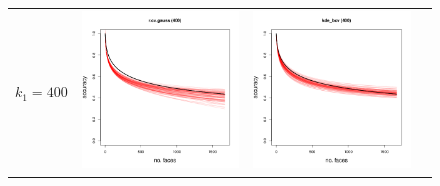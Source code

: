 \documentclass[twoside,11pt]{article}
\newenvironment{myfont}{\fontfamily{phv}\selectfont}{\par}
\begin{document}
\begin{figure}[t]
\begin{tabular}{cccc}
\begin{myfont}$k_1 = 400$\end{myfont} &
\includegraphics[scale = 0.2, clip = true, trim = 0 0 0 0.6in, valign=c]{repeat_400_r_cv_gauss.png} &
\includegraphics[scale = 0.2, clip = true, trim = 0 0 0 0.6in, valign=c]{repeat_400_kde_bcv.png} &

\end{tabular}
\end{figure}
\end{document}
